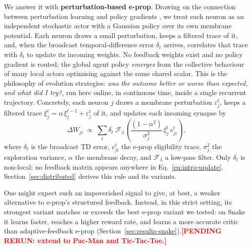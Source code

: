 \documentclass[10pt,twocolumn]{article}
\newcommand{\pending}[1]{\textcolor{red}{\bfseries[PENDING RERUN#1]}}
\newcommand{\method}{perturbation-based e-prop}   %
\begin{document}
We answer it with \textbf{\method{}}. Drawing on the connection
between perturbation learning and policy gradients
\citep{fiete2006gradient,salimans2017evolutionstrategiesscalablealternative},
we treat each neuron as an independent stochastic actor with a Gaussian policy
over its own membrane potential. Each neuron draws a small perturbation, keeps
a filtered trace of it, and, when the broadcast temporal-difference error
$\delta_t$ arrives, correlates that trace with $\delta_t$ to update its
incoming weights. No feedback weights exist and no policy gradient is routed;
the global agent policy \emph{emerges} from the collective behaviour of many
local actors optimising against the same shared scalar. This is the
philosophy of evolution strategies: \emph{was the outcome better or worse
than expected, and what did I try?}, run here online, in continuous time,
inside a single recurrent trajectory. Concretely, each neuron $j$ draws a
membrane perturbation
$\varepsilon_j^t$, keeps a filtered trace
$\xi_j^t = \alpha\,\xi_j^{t-1} + \varepsilon_j^t$ of it, and updates each incoming
synapse by
\begin{equation}
\Delta W_{ji} \;\propto\; \sum_t \delta_t\;
\mathcal{F}_{\lambda}\!\left(
\frac{(1-\alpha^2)}{\sigma_j^2}\,\xi_j^t\, e_{ji}^t \right),
\label{eq:intro-update}
\end{equation}
where $\delta_t$ is the broadcast TD error, $e_{ji}^t$ the e-prop eligibility
trace, $\sigma_j^2$ the exploration variance, $\alpha$ the membrane decay, and
$\mathcal{F}_{\lambda}$ a low-pass filter. Only $\delta_t$ is non-local; no
feedback matrix appears anywhere in Eq.~\eqref{eq:intro-update}.
Section~\ref{sec:distributed} derives this rule and its variants.

One might expect such an impoverished signal to give, at best, a weaker
alternative to e-prop's structured feedback. Instead, in this strict setting,
its strongest variant matches or exceeds the best e-prop variant we tested: on
Snake it learns faster, reaches a higher reward rate, and learns a more
accurate critic than adaptive-feedback e-prop
(Section~\ref{sec:results-snake}).\pending{: extend to Pac-Man and
Tic-Tac-Toe.}
\end{document}

